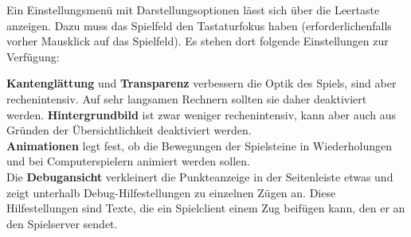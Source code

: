 \documentclass[a4paper, ngerman]{scrartcl}
\begin{document}
	Ein Einstellungsmenü mit Darstellungsoptionen lässt
sich über die Leertaste anzeigen. Dazu muss das
Spielfeld den Tastaturfokus haben (erforderlichenfalls
vorher Mausklick auf das Spielfeld). Es stehen dort
folgende Einstellungen zur Verfügung: 

\textbf{Kantenglättung} und \textbf{Transparenz} verbessern die Optik des
Spiels, sind aber rechenintensiv. Auf sehr langsamen Rechnern sollten sie daher
deaktiviert werden. \textbf{Hintergrundbild} ist zwar weniger rechenintensiv,
kann aber auch aus Gründen der Übersichtlichkeit deaktiviert werden.\\
\textbf{Animationen} legt fest, ob die Bewegungen der Spielsteine in
Wiederholungen und bei Computerspielern animiert werden sollen.\\
Die \textbf{Debugansicht} verkleinert die Punkteanzeige in der Seitenleiste
etwas und zeigt unterhalb Debug-Hilfestellungen zu einzelnen Zügen an. Diese
Hilfestellungen sind Texte, die ein Spielclient einem Zug beifügen kann, den er
an den Spielserver sendet.
	
\end{document}
